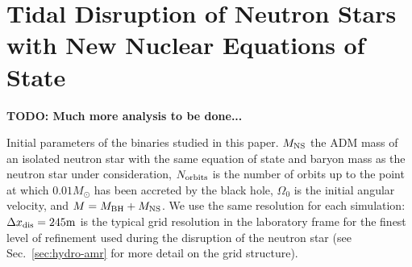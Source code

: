 \chapter{Tidal Disruption of Neutron Stars with New Nuclear Equations of State}
\label{chap:chapter-5}

\textbf{TODO: Much more analysis to be done...}

\begin{table}
	\begin{center}
	\caption[Initial parameters of binaries used in this survey]{
		Initial parameters of the binaries studied in this paper. 
		$M_{\rm NS}$ the ADM mass of an isolated neutron star with the same equation of state and baryon mass as the neutron star under
		consideration, $N_{\rm orbits}$ is the number of orbits up to the point at which $0.01M_\odot$ has been accreted by the black hole,
		$\Omega_0$ is the initial angular velocity, and $M=M_{\rm BH}+M_{\rm NS}$. We use the same resolution for each simulation: $\Delta x_{\rm dis} = 245{\rm m}$ is the typical grid resolution in the laboratory frame
		for the finest level of refinement used during the disruption of the neutron star (see Sec.~\ref{sec:hydro-amr} for more detail on the grid structure).}
	\label{tab:id}
	{
		
	}
	\end{center}
\end{table}

